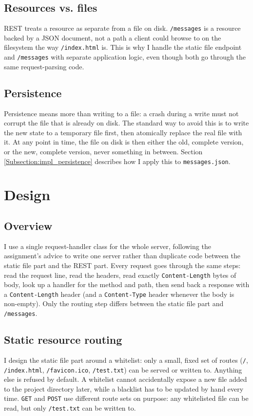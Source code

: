 \documentclass[conference]{IEEEtran}
\begin{document}
\subsection{Resources vs. files}\label{Subsection:rest_resource}
REST treats a resource as separate from a file on disk. \texttt{/messages}
is a resource backed by a JSON document, not a path a client could browse
to on the filesystem the way \texttt{/index.html} is. This is why I handle
the static file endpoint and \texttt{/messages} with separate application
logic, even though both go through the same request-parsing code.

\subsection{Persistence}\label{Subsection:persistence_theory}
Persistence means more than writing to a file: a crash during a write must
not corrupt the file that is already on disk. The standard way to avoid
this is to write the new state to a temporary file first, then atomically
replace the real file with it. At any point in time, the file on disk is
then either the old, complete version, or the new, complete version, never
something in between. Section \ref{Subsection:impl_persistence} describes
how I apply this to \texttt{messages.json}.

\section{Design}\label{Section:Design}

\subsection{Overview}\label{Subsection:design_overview}
I use a single request-handler class for the whole server, following the
assignment's advice to write one server rather than duplicate code between
the static file part and the REST part. Every request goes through the
same steps: read the request line, read the headers, read exactly
\texttt{Content-Length} bytes of body, look up a handler for the method
and path, then send back a response with a \texttt{Content-Length} header
(and a \texttt{Content-Type} header whenever the body is non-empty). Only
the routing step differs between the static file part and
\texttt{/messages}.

\subsection{Static resource routing}\label{Subsection:design_static}
I design the static file part around a whitelist: only a small, fixed set
of routes (\texttt{/}, \texttt{/index.html}, \texttt{/favicon.ico},
\texttt{/test.txt}) can be served or written to. Anything else is refused
by default. A whitelist cannot accidentally expose a new file added to the
project directory later, while a blacklist has to be updated by hand every
time. \texttt{GET} and \texttt{POST} use different route sets on purpose:
any whitelisted file can be read, but only \texttt{/test.txt} can be
written to.
\end{document}

